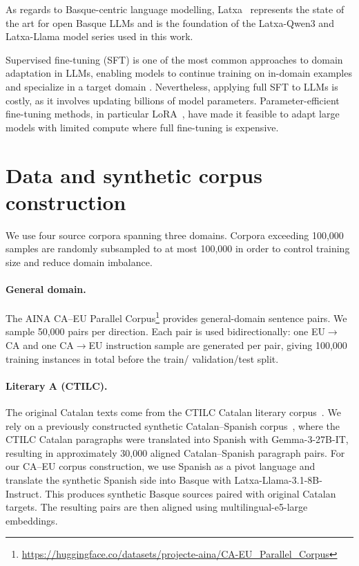 \documentclass[11pt,a4paper]{article}
\begin{document}
As regards to Basque-centric language modelling, Latxa~\cite{etxaniz-etal-2024-latxa}
represents the state of the art for open Basque LLMs and is the
foundation of the Latxa-Qwen3 and Latxa-Llama model series used
in this work.
 
Supervised fine-tuning (SFT) is one of the most common approaches to
domain adaptation in LLMs, enabling models to continue training on
in-domain examples and specialize in a target domain
\cite{alves-etal-2023-steering,eschbach-dymanus-etal-2024-exploring}. Nevertheless, applying full SFT
to LLMs is costly, as it involves updating billions
of model parameters. 
Parameter-efficient fine-tuning methods, in particular
LoRA~\cite{hu2022lora}, have made it feasible to adapt large
models with limited compute where full fine-tuning is
expensive.
 

\section{Data and synthetic corpus construction}
\label{sec:data}

We use four source corpora spanning three domains. Corpora exceeding
100,000 samples are randomly subsampled to at most 100,000 in
order to control training size and reduce domain imbalance.

\paragraph{General domain.} The AINA CA--EU Parallel Corpus\footnote{\url{https://huggingface.co/datasets/projecte-aina/CA-EU_Parallel_Corpus}}
 provides general-domain
sentence pairs. We sample 50,000 pairs per direction. Each pair is used bidirectionally:
one EU$\to$CA and one CA$\to$EU instruction sample are generated per
pair, giving 100,000 training instances in total before the train/
validation/test split.


\paragraph{Literary A (CTILC).}
The original Catalan texts come from the CTILC Catalan literary
corpus~\cite{ctilc_iec}. We rely on a previously constructed synthetic
Catalan--Spanish corpus~\cite{guerrero2026ca_es_corpus}, where the
CTILC Catalan paragraphs were translated into Spanish with
Gemma-3-27B-IT, resulting in approximately 30,000 aligned
Catalan--Spanish paragraph pairs. For our CA--EU corpus construction,
we use Spanish as a pivot language and translate the synthetic Spanish
side into Basque with Latxa-Llama-3.1-8B-Instruct. This produces
synthetic Basque sources paired with original Catalan targets. The
resulting pairs are then aligned using multilingual-e5-large embeddings.
\end{document}
